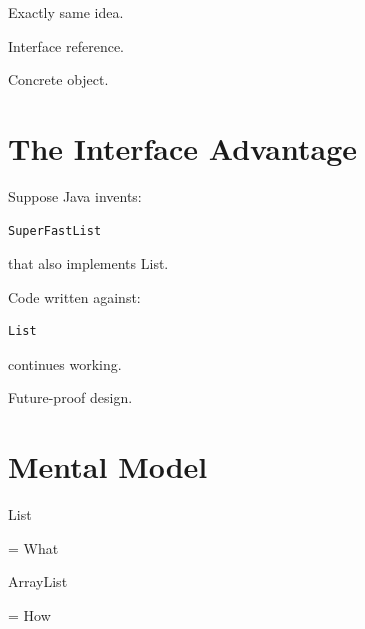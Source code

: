 \documentclass[11pt,a4paper]{book}
\begin{document}

Exactly same idea.


Interface reference.


Concrete object.


\section{The Interface Advantage}

Suppose Java invents:

\begin{verbatim} 
SuperFastList
\end{verbatim}


that also implements List.


Code written against:

\begin{verbatim} 
List
\end{verbatim}


continues working.


Future-proof design.


\section{Mental Model}

\begin{mentalmodel}

List

=
What


ArrayList

=
How

\end{mentalmodel}
\end{document}
